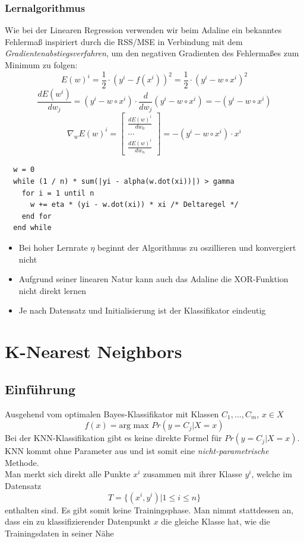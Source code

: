 \documentclass{report}
\begin{document}
\subsection{Lernalgorithmus}
Wie bei der Linearen Regression verwenden wir beim Adaline ein bekanntes Fehlermaß inspiriert
durch die RSS/MSE in Verbindung mit dem \textit{Gradientenabstiegsverfahren}, um den negativen Gradienten
des Fehlermaßes zum Minimum zu folgen:\\
$$E(w)^i = \frac{1}{2}\cdot (y^i - f(x^i))^2 = \frac{1}{2}\cdot(y^i - w\circ x^i)^2$$
$$\frac{dE(w^i)}{dw_j} = (y^i - w\circ x^i)\cdot \frac{d}{dw_j}(y^i - w\circ x^i) = -(y^i - w\circ x^i)$$
$$\nabla_wE(w)^i = \begin{bmatrix}\frac{dE(w)^i}{dw_0}\\...\\\frac{dE(w)^i}{dw_n}\end{bmatrix} = -(y^i - w\circ x^i)\cdot x^i$$

\begin{lstlisting}
  w = 0
  while (1 / n) * sum(|yi - alpha(w.dot(xi))|) > gamma
    for i = 1 until n
      w += eta * (yi - w.dot(xi)) * xi /* Deltaregel */
    end for
  end while
\end{lstlisting}

\begin{itemize}
  \item Bei hoher Lernrate $\eta$ beginnt der Algorithmus zu oszillieren und konvergiert nicht
  \item Aufgrund seiner linearen Natur kann auch das Adaline die XOR-Funktion nicht direkt lernen
  \item Je nach Datensatz und Initialisierung ist der Klassifikator eindeutig
\end{itemize}

\chapter{K-Nearest Neighbors}
\section{Einführung}
Ausgehend vom optimalen Bayes-Klassifikator mit Klassen $C_1, ..., C_m$, $x\in X$
$$f(x) = \text{arg max } Pr(y=C_j|X=x)$$
Bei der KNN-Klassifikation gibt es keine direkte Formel für $Pr(y = C_j|X = x)$.\\
KNN kommt ohne Parameter aus und ist somit eine \textit{nicht-parametrische} Methode.\\
Man merkt sich direkt alle Punkte $x^i$ zusammen mit ihrer Klasse $y^i$, welche im Datensatz
$$T = \{(x^i, y^i)|1\leq i \leq n\}$$
enthalten sind. Es gibt somit keine Trainingsphase. Man nimmt stattdessen an, dass ein zu klassifizierender
Datenpunkt $x$ die gleiche Klasse hat, wie die Trainingsdaten in seiner Nähe
\end{document}
